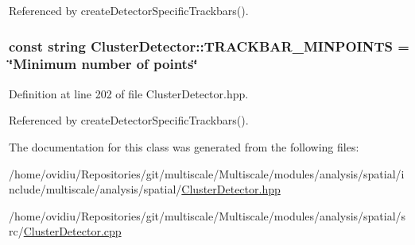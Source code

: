 \-Referenced by create\-Detector\-Specific\-Trackbars().

\hypertarget{classmultiscale_1_1analysis_1_1ClusterDetector_a7f0fbbf3de8479b106893c4a8161bdaf}{
\subsubsection[{\-T\-R\-A\-C\-K\-B\-A\-R\-\_\-\-M\-I\-N\-P\-O\-I\-N\-T\-S}]{\setlength{\rightskip}{0pt plus 5cm}const string {\bf \-Cluster\-Detector\-::\-T\-R\-A\-C\-K\-B\-A\-R\-\_\-\-M\-I\-N\-P\-O\-I\-N\-T\-S} = \char`\"{}\-Minimum number of points\char`\"{}}}\label{classmultiscale_1_1analysis_1_1ClusterDetector_a7f0fbbf3de8479b106893c4a8161bdaf}


\-Definition at line 202 of file \-Cluster\-Detector.\-hpp.



\-Referenced by create\-Detector\-Specific\-Trackbars().



\-The documentation for this class was generated from the following files\-:\begin{DoxyCompactItemize}
\item 
/home/ovidiu/\-Repositories/git/multiscale/\-Multiscale/modules/analysis/spatial/include/multiscale/analysis/spatial/\hyperlink{ClusterDetector_8hpp}{\-Cluster\-Detector.\-hpp}\item 
/home/ovidiu/\-Repositories/git/multiscale/\-Multiscale/modules/analysis/spatial/src/\hyperlink{ClusterDetector_8cpp}{\-Cluster\-Detector.\-cpp}\end{DoxyCompactItemize}
